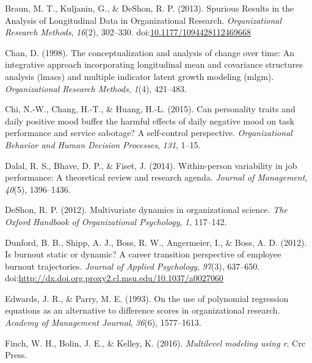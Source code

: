 \documentclass[english,,man]{apa6}
\theoremstyle{definition}
\theoremstyle{definition}
\theoremstyle{definition}
\theoremstyle{remark}
\begin{document}
\leavevmode\hypertarget{ref-braun_spurious_2013}{}%
Braun, M. T., Kuljanin, G., \& DeShon, R. P. (2013). Spurious Results in
the Analysis of Longitudinal Data in Organizational Research.
\emph{Organizational Research Methods}, \emph{16}(2), 302--330.
doi:\href{https://doi.org/10.1177/1094428112469668}{10.1177/1094428112469668}

\leavevmode\hypertarget{ref-chan1998conceptualization}{}%
Chan, D. (1998). The conceptualization and analysis of change over time:
An integrative approach incorporating longitudinal mean and covariance
structures analysis (lmacs) and multiple indicator latent growth
modeling (mlgm). \emph{Organizational Research Methods}, \emph{1}(4),
421--483.

\leavevmode\hypertarget{ref-chi_can_2015}{}%
Chi, N.-W., Chang, H.-T., \& Huang, H.-L. (2015). Can personality traits
and daily positive mood buffer the harmful effects of daily negative
mood on task performance and service sabotage? A self-control
perspective. \emph{Organizational Behavior and Human Decision
Processes}, \emph{131}, 1--15.

\leavevmode\hypertarget{ref-dalal2014within}{}%
Dalal, R. S., Bhave, D. P., \& Fiset, J. (2014). Within-person
variability in job performance: A theoretical review and research
agenda. \emph{Journal of Management}, \emph{40}(5), 1396--1436.

\leavevmode\hypertarget{ref-deshon_multivariate_2012}{}%
DeShon, R. P. (2012). Multivariate dynamics in organizational science.
\emph{The Oxford Handbook of Organizational Psychology}, \emph{1},
117--142.

\leavevmode\hypertarget{ref-dunford_is_2012}{}%
Dunford, B. B., Shipp, A. J., Boss, R. W., Angermeier, I., \& Boss, A.
D. (2012). Is burnout static or dynamic? A career transition perspective
of employee burnout trajectories. \emph{Journal of Applied Psychology},
\emph{97}(3), 637--650.
doi:\href{https://doi.org/http://dx.doi.org.proxy2.cl.msu.edu/10.1037/a0027060}{http://dx.doi.org.proxy2.cl.msu.edu/10.1037/a0027060}

\leavevmode\hypertarget{ref-edwards1993use}{}%
Edwards, J. R., \& Parry, M. E. (1993). On the use of polynomial
regression equations as an alternative to difference scores in
organizational research. \emph{Academy of Management Journal},
\emph{36}(6), 1577--1613.

\leavevmode\hypertarget{ref-finch2016multilevel}{}%
Finch, W. H., Bolin, J. E., \& Kelley, K. (2016). \emph{Multilevel
modeling using r}. Crc Press.
\end{document}
